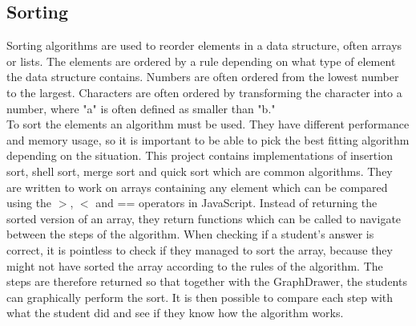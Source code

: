 \subsection{Sorting}
Sorting algorithms are used to reorder elements in a data structure, often arrays or lists. The elements are ordered by a rule depending on what type of element the data structure contains. Numbers are often ordered from the lowest number to the largest. Characters are often ordered by transforming the character into a number, where "a" is often defined as smaller than "b."
\\[11pt]
To sort the elements an algorithm must be used. They have different performance and memory usage, so it is important to be able to pick the best fitting algorithm depending on the situation. This project contains implementations of insertion sort, shell sort, merge sort and quick sort which are common algorithms. They are written to work on arrays containing any element which can be compared using the $>$, $<$ and == operators in JavaScript. Instead of returning the sorted version of an array, they return functions which can be called to navigate between the steps of the algorithm. When checking if a student's answer is correct, it is pointless to check if they managed to sort the array, because they might not have sorted the array according to the rules of the algorithm. The steps are therefore returned so that together with the GraphDrawer, the students can graphically perform the sort. It is then possible to compare each step with what the student did and see if they know how the algorithm works.





